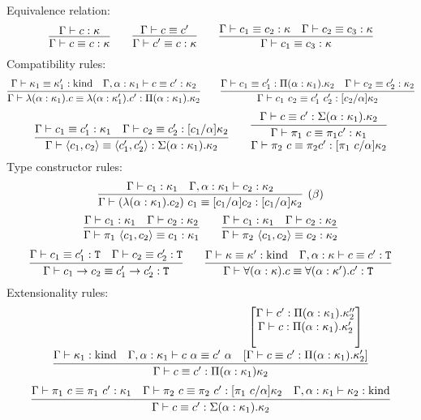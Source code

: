 \begin{judgment}\mbox{}\\
Equivalence relation:
  \[
    \infer{\Gamma \vdash c \equiv c : \kappa}{\Gamma \vdash c : \kappa}
    \qquad
    \infer{\Gamma \vdash c' \equiv c : \kappa}{\Gamma \vdash c \equiv c'}
    \qquad
    \infer{\Gamma \vdash c_1 \equiv c_3 : \kappa}
      {\Gamma \vdash c_1 \equiv c_2 : \kappa
      &\Gamma \vdash c_2 \equiv c_3 : \kappa
      }
  \]
Compatibility rules:
  \[
    \infer{\Gamma \vdash \lambda(\alpha : \kappa_1).c \equiv \lambda(\alpha : \kappa_1').c'
      : \Pi(\alpha : \kappa_1).\kappa_2}
      {\Gamma \vdash \kappa_1 \equiv \kappa_1' : \kind
      &\Gamma, \alpha : \kappa_1 \vdash c \equiv c' : \kappa_2
      }
    \qquad
    \infer{\Gamma \vdash c_1~c_2 \equiv c_1'~c_2' : [c_2/\alpha]\kappa_2}
      {\Gamma \vdash c_1 \equiv c_1' : \Pi(\alpha : \kappa_1).\kappa_2
      &\Gamma \vdash c_2 \equiv c_2' : \kappa_2
      }
  \]
  \[
    \infer{\Gamma \vdash \langle c_1, c_2 \rangle \equiv \langle c_1', c_2' \rangle
      : \Sigma(\alpha : \kappa_1).\kappa_2}
      {\Gamma \vdash c_1 \equiv c_1' : \kappa_1
      &\Gamma \vdash c_2 \equiv c_2' : [c_1 / \alpha]\kappa_2
      }
    \qquad
    \infer{
      \deduce
         {\Gamma \vdash \pi_2~c \equiv \pi_2 c' : [\pi_1~c/\alpha]\kappa_2}
         {\Gamma \vdash \pi_1~c \equiv \pi_1 c' : \kappa_1}
      }
      {\Gamma \vdash c \equiv c' : \Sigma(\alpha : \kappa_1).\kappa_2}
  \]
  Type constructor rules:
  \[
    \infer[(\beta)]
      {\Gamma \vdash (\lambda (\alpha : \kappa_1). c_2)~c_1 \equiv
        [c_1/\alpha]c_2 : [c_1/\alpha]\kappa_2}
      {\Gamma \vdash c_1 : \kappa_1
      &\Gamma, \alpha : \kappa_1 \vdash c_2 : \kappa_2
      }
  \]
  \[
    \infer{\Gamma \vdash \pi_1~\langle c_1, c_2 \rangle \equiv c_1 : \kappa_1}
      {\Gamma \vdash c_1 : \kappa_1
      &\Gamma \vdash c_2 : \kappa_2
      }
    \qquad
    \infer{\Gamma \vdash \pi_2~\langle c_1, c_2 \rangle \equiv c_2 : \kappa_2}
      {\Gamma \vdash c_1 : \kappa_1
      &\Gamma \vdash c_2 : \kappa_2
      }
  \]
  \[
    \infer{\Gamma \vdash c_1 \to c_2 \equiv c_1' \to c_2' : \T}
      {\Gamma \vdash c_1 \equiv c_1' : \T
      &\Gamma \vdash c_2 \equiv c_2' : \T
      }
    \qquad
    \infer{\Gamma \vdash \forall (\alpha : \kappa).c \equiv \forall(\alpha : \kappa').c' : \T}
      {\Gamma \vdash \kappa \equiv \kappa' : \kind
      &\Gamma, \alpha : \kappa \vdash c \equiv c' : \T
      }
  \]
Extensionality rules:
\[
  \infer{\Gamma \vdash c \equiv c' : \Pi(\alpha : \kappa_1) \kappa_2}
    {\Gamma \vdash \kappa_1 : \kind
    &\Gamma, \alpha : \kappa_1 \vdash c~\alpha \equiv c'~\alpha
    &\deduce{\left[ \Gamma \vdash c \equiv c' : \Pi(\alpha : \kappa_1).\kappa_2' \right]}
      {
        \left[\deduce{\Gamma \vdash c : \Pi(\alpha : \kappa_1).\kappa_2'}
              {\Gamma \vdash c' : \Pi(\alpha : \kappa_1).\kappa_2''}\right]
      }
    }
\]
\[
  \infer{\Gamma \vdash c \equiv c' : \Sigma(\alpha : \kappa_1).\kappa_2}
    {\Gamma \vdash \pi_1~c \equiv \pi_1~c' : \kappa_1
    &\Gamma \vdash \pi_2~c \equiv \pi_2~c' : [\pi_1~c/\alpha]\kappa_2
    &\Gamma, \alpha : \kappa_1 \vdash \kappa_2 : \kind
    }
\]
\end{judgment}
